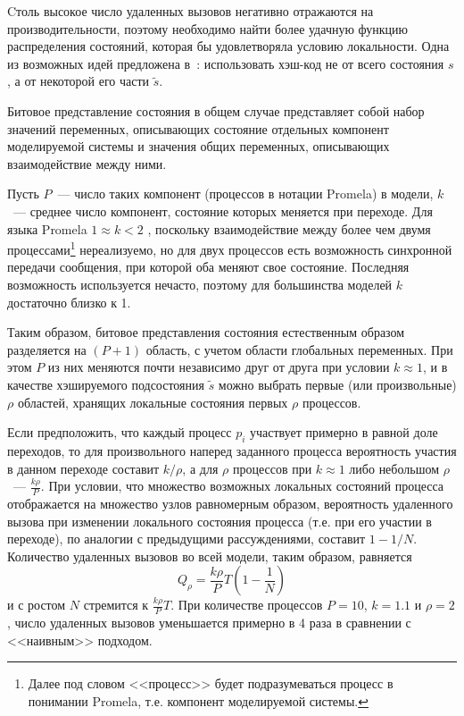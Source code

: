 \documentclass[12pt,a4paper,fleqn]{article}
\begin{document}
Cтоль высокое число удаленных вызовов негативно отражаются на производительности, поэтому необходимо найти более удачную
функцию распределения состояний, которая бы удовлетворяла условию локальности. Одна из возможных идей предложена
в~\cite{LS99}: использовать хэш-код не от всего состояния $s$, а от некоторой его части $\tilde{s}$.

Битовое представление состояния в общем случае представляет собой набор значений переменных, описывающих состояние
отдельных компонент моделируемой системы и значения общих переменных, описывающих взаимодействие между ними.

Пусть $P$~--- число таких компонент (процессов в нотации Promela) в модели, $k$~--- среднее число компонент, состояние
которых меняется при переходе. Для языка Promela $1 \approx k < 2$ , поскольку взаимодействие между более чем двумя
процессами\footnote{Далее под словом <<процесс>> будет подразумеваться процесс в понимании Promela, т.е. компонент
  моделируемой системы.} нереализуемо, но для двух процессов есть возможность синхронной передачи сообщения, при которой
оба меняют свое состояние. Последняя возможность используется нечасто, поэтому для большинства моделей $k$ достаточно
близко к 1.

Таким образом, битовое представления состояния естественным образом разделяется на $(P+1)$ область, с учетом области
глобальных переменных. При этом $P$ из них меняются почти независимо друг от друга при условии $k \approx 1$, и в
качестве хэшируемого подсостояния $\tilde{s}$ можно выбрать первые (или произвольные) $\rho$ областей, хранящих
локальные состояния первых $\rho$ процессов.

Если предположить, что каждый процесс $p_i$ участвует примерно в равной доле переходов, то для произвольного наперед
заданного процесса вероятность участия в данном переходе составит $k/\rho$, а для $\rho$ процессов при $k \approx 1$
либо небольшом $\rho$~--- $\frac{k \rho}{P}$. При условии, что множество возможных локальных состояний процесса
отображается на множество узлов равномерным образом, вероятность удаленного вызова при изменении локального состояния
процесса (т.е. при его участии в переходе), по аналогии с предыдущими рассуждениями, составит $1 - 1/N$. Количество
удаленных вызовов во всей модели, таким образом, равняется
\begin{equation}
  \label{eq:rpc-partproc}
  Q_\rho = \frac{k \rho}{P} T (1 - \frac{1}{N})
\end{equation}
и с ростом $N$ стремится к $\frac{k \rho}{P} T$. При количестве процессов $P = 10$, $k = 1.1$ и $\rho = 2$, число
удаленных вызовов уменьшается примерно в 4 раза в сравнении с <<наивным>> подходом.
\end{document}
